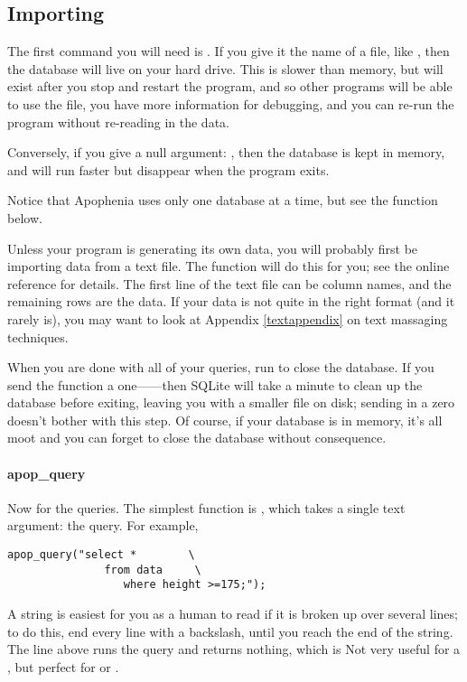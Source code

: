 \subsection{Importing}
The first command you will need is . If you give
it the name of a file, like , then the
database will live on your hard drive. This is slower than memory, but
will exist after you stop and restart the program, and so other programs
will be able to use the file, you have more information for debugging,
and you can re-run the program without re-reading in the data.

Conversely, if you give a null argument: ,
then the database is kept in memory, and will run faster but 
disappear when the program exits.

Notice that Apophenia uses only one database at a time, but
see the  function below.

Unless your program is generating its own data, you will probably
first be importing data from a text file.  The 
function will do this for you; see the online reference for details. The
first line of the text file can be column names, and the remaining rows
are the data. If your data is not quite in the right format (and it
rarely is), you may want to look at Appendix \ref{textappendix} on text
massaging techniques.

When you are done with all of your queries, run
 to close the database. If you send the function a
one------then SQLite will take a minute to clean
up the database before exiting, leaving you with a smaller file on disk;
sending in a zero doesn't bother with this step. Of course, if your
database is in memory, it's all moot and you can forget to close the
database without consequence.


\paragraph{apop\_query} Now for the queries. The simplest function
is , which takes a single text argument: the
query. For example,
\setc {}
\begin{lstlisting}
apop_query("select *        \
               from data     \
                  where height >=175;");
\end{lstlisting}

A string is easiest for you as a human to read if it is
broken up over several lines; to do this, end every line with a
backslash, until you reach the end of the string. The line above runs
the query and returns nothing, which is Not very useful for a , but perfect for
\sinline{create} or \sinline{insert}.

